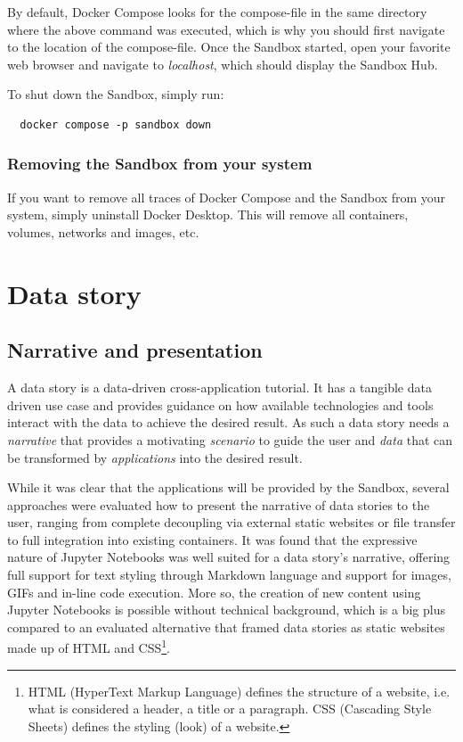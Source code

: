 \documentclass[11pt, a4paper, oneside, parskip=full-]{scrartcl}
\begin{document}
By default, Docker Compose looks for the compose-file in the same directory
where the above command was executed, which is why you should first navigate to
the location of the compose-file. Once the Sandbox started, open your favorite
web browser and navigate to \emph{localhost}, which should display the Sandbox
Hub.

To shut down the Sandbox, simply run:
\begin{lstlisting}
  docker compose -p sandbox down
\end{lstlisting}

\subsubsection*{Removing the Sandbox from your system}
If you want to remove all traces of Docker Compose and the Sandbox from your
system, simply uninstall Docker Desktop. This will remove all containers,
volumes, networks and images, etc.

\section{Data story}

\subsection{Narrative and presentation}
A data story is a data-driven cross-application tutorial. It has a tangible data
driven use case and provides guidance on how available technologies and tools
interact with the data to achieve the desired result. As such a data story needs
a \emph{narrative} that provides a motivating \emph{scenario} to guide the user
and \emph{data} that can be transformed by \emph{applications} into the desired
result.

While it was clear that the applications will be provided by the Sandbox,
several approaches were evaluated how to present the narrative of data stories
to the user, ranging from complete decoupling via external static websites or
file transfer to full integration into existing containers. It was found that
the expressive nature of Jupyter Notebooks was well suited for a data story's
narrative, offering full support for text styling through Markdown language and
support for images, GIFs and in-line code execution. More so, the creation of
new content using Jupyter Notebooks is possible without technical background,
which is a big plus compared to an evaluated alternative that framed data
stories as static websites made up of HTML and CSS\footnote{HTML (HyperText
Markup Language) defines the structure of a website, i.e. what is considered a
header, a title or a paragraph. CSS (Cascading Style Sheets) defines the styling
(look) of a website.}.
\end{document}
